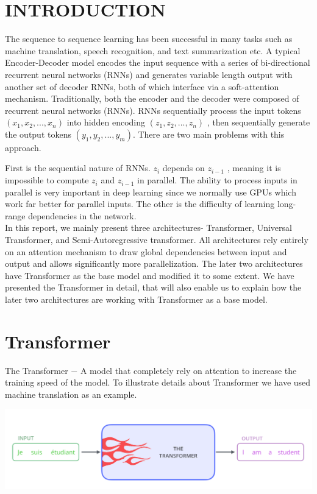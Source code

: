 \documentclass{article}
\begin{document}
	\begin{multicols}{2}
	\section{INTRODUCTION}
The sequence to sequence learning has been successful in many tasks such as machine translation, speech recognition, and text summarization etc. A typical Encoder-Decoder model encodes the input sequence with a series of bi-directional recurrent neural networks (RNNs) and generates variable length output with another set of decoder RNNs, both of which interface via a soft-attention mechanism.
Traditionally, both the encoder and the decoder were composed of recurrent neural networks (RNNs). RNNs sequentially process the input tokens $(x_1, x_2, ... , x_n)$  into hidden encoding $(z_1, z_2, ... , z_n)$ , then sequentially generate the output tokens $(y_1, y_2, ... , y_m)$. There are two main problems with this approach.

First is the sequential nature of RNNs. $z_i$  depends on $z_{i-1}$ , meaning it is impossible to compute $z_i$  and $z_{i-1}$  in parallel. The ability to process inputs in parallel is very important in deep learning since we normally use GPUs which work far better for parallel inputs. The other is the difficulty of learning long-range dependencies in the network. 
\\ In this report, we mainly present three architectures-  Transformer, Universal Transformer, and Semi-Autoregressive transformer. All architectures rely entirely on an attention mechanism to draw global dependencies between input and output and allows significantly more parallelization. The later two architectures have Transformer as the base model and modified it to some extent. We have presented the Transformer in detail, that will also enable us to explain how the later two architectures are working with Transformer as a base model.
		
	\section{Transformer}
The Transformer $-$ A model that completely rely on attention to increase the training speed of the model. To illustrate details about Transformer we have used machine translation as an example.


\begin{center}
\captionsetup{type=figure}
        \includegraphics[width=.47\textwidth]{the_transformer_blackbox.png}
\end{center}


\end{multicols}
\end{document}
